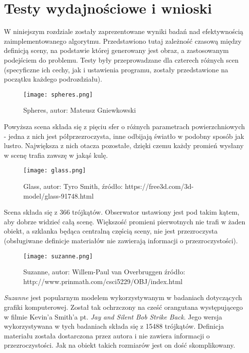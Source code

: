 \section{Testy wydajnościowe i wnioski}

W niniejszym rozdziale zostały zaprezentowane wyniki badań nad efektywnością zaimplementowanego algorytmu. Przedstawiono tutaj zależność czasową między definicją sceny, na podstawie której generowany jest obraz, a zastosowanym podejściem do problemu. Testy były przeprowadzane dla czterech różnych scen (specyficzne ich cechy, jak i ustawienia programu, zostały przedstawione na początku każdego podrozdziału).

\begin{figure}[H]
\centering
  \texttt{[image: spheres.png]}
    \caption{Spheres, autor: Mateusz Gniewkowski}
\end{figure}

Powyższa scena składa się z pięciu sfer o różnych parametrach powierzchniowych - jedna z nich jest półprzezroczysta, inne odbijają światło w podobny sposób jak lustro. Największa z nich otacza pozostałe, dzięki czemu każdy promień wysłany w scenę trafia zawszę w jakąś kulę.

\begin{figure}[H]
\centering
  \texttt{[image: glass.png]}
    \caption{Glass, autor: Tyro Smith, źródło: https://free3d.com/3d-model/glass-91748.html}
\end{figure}

Scena składa się z 366 trójkątów. Obserwator ustawiony jest pod takim kątem, aby dobrze widzieć całą scenę. Większość promieni pierwotnych nie trafi w żaden obiekt, a szklanka będąca centralną częścią sceny, nie jest przezroczysta (obsługiwane definicje materiałów nie zawierają informacji o przezroczystości).
\pagebreak

\begin{figure}[H]
\centering
  \texttt{[image: suzanne.png]}
  \caption{Suzanne, autor: Willem-Paul van Overbruggen źródło: http://www.prinmath.com/csci5229/OBJ/index.html}
\end{figure}


\emph{Suzanne} jest popularnym modelem wykorzystywanym w badaniach dotyczących grafiki komputerowej. Został tak ochrzczony na cześć orangutana występującego w filmie Kevin'a Smith'a pt. \emph{Jay and Silent Bob Strike Back}. Jego wersja wykorzystywana w tych badaniach składa się z 15488 trójkątów. Definicja materiału została dostarczona przez autora i nie zawiera informacji o przezroczystości. Jak na obiekt takich rozmiarów jest on dość skomplikowany.

